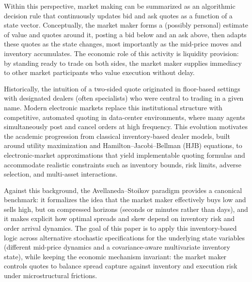 \documentclass[a4paper,10pt,titlepage,oneside,openany]{book}
\theoremstyle{plain}\newtheorem{theorem}{Theorem}[chapter]
\theoremstyle{definition}\newtheorem{definition}{Definition}[chapter]
\theoremstyle{remark}\newtheorem{remark}{Remark}[chapter]
\begin{document}
Within this perspective, market making can be summarized as an algorithmic decision rule that continuously updates bid and ask quotes as a function of a state vector. Conceptually, the market maker forms a (possibly personal) estimate of value and quotes around it, posting a bid below and an ask above, then adapts these quotes as the state changes, most importantly as the mid-price moves and inventory accumulates. The economic role of this activity is liquidity provision: by standing ready to trade on both sides, the market maker supplies immediacy to other market participants who value execution without delay.

Historically, the intuition of a two-sided quote originated in floor-based settings with designated dealers (often specialists) who were central to trading in a given name. Modern electronic markets replace this institutional structure with competitive, automated quoting in data-center environments, where many agents simultaneously post and cancel orders at high frequency. This evolution motivates the academic progression from classical inventory-based dealer models, built around utility maximization and Hamilton--Jacobi--Bellman (HJB) equations, to electronic-market approximations that yield implementable quoting formulas and accommodate realistic constraints such as inventory bounds, risk limits, adverse selection, and multi-asset interactions.

Against this background, the Avellaneda--Stoikov paradigm provides a canonical benchmark: it formalizes the idea that the market maker effectively buys low and sells high, but on compressed horizons (seconds or minutes rather than days), and it makes explicit how optimal spreads and skew depend on inventory risk and order arrival dynamics. The goal of this paper is to apply this inventory-based logic across alternative stochastic specifications for the underlying state variables (different mid-price dynamics and a covariance-aware multivariate inventory state), while keeping the economic mechanism invariant: the market maker controls quotes to balance spread capture against inventory and execution risk under microstructural frictions.
\end{document}
